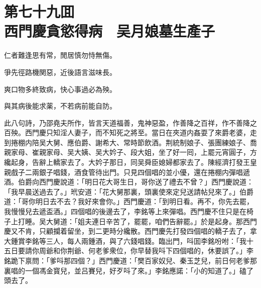 
\chapter*{第七十九囬　\\西門慶貪慾得病　吴月娘墓生產子}


\begin{myquote}
仁者難逢思有常，閒居慎勿恃無傷。

爭先徑路機関惡，近後語言滋味長。

爽口物多終致病，快心事過必為殃。

與其病後能求薬，不若病前能自防。
\end{myquote}

此八句詩，乃邵堯夫所作，皆言天道福善，鬼神惡盈，作善降之百祥，作不善降之百殃。西門慶只知淫人妻子，而不知死之將至。當日在夾道内姦耍了來爵老婆，走到捲棚内陪吴大舅、應伯爵、謝希大、常時節飲酒。荆統制娘子、張團練娘子、喬親家母、崔親家母、吴大姨、吴大妗子、段大姐，坐了好一囘，上罷元宵圓子，方纔起身，告辭上轎家去了。大妗子那日，同吴舜臣媳婦都家去了。陳經濟打發王皇親戲子二兩銀子唱錢，酒食管待出門。只見四個唱的並小優，還在捲棚内彈唱遞酒。伯爵向西門慶說道：「明日花大哥生日，哥你送了禮去不曾？」西門慶說道：「我早晨送過去了。」玳安道：「花大舅那裏，頭裏使來定兒送請帖兒來了。」伯爵道：「哥你明日去不去？我好來會你。」西門慶道：「到明日看。再不，你先去罷，我慢慢兒去遞盃酒。」四個唱的後邊去了，李銘等上來彈唱。西門慶不住只是在椅子上打睡。吴大舅道：「姐夫連日辛苦了，罷罷，咱們告辭罷。」於是起身。那西門慶又不肯，只顧攔着留坐，到二更時分纔散。西門慶先打發四個唱的轎子去了，拿大鍾賞李銘等三人，每人兩鍾酒，與了六錢唱錢。臨出門，呌囬李銘吩咐：「我十五日要請你周爺和你荆爺、何老爹衆位，你早替我呌下四個唱的，休要誤了。」李銘跪下禀問：「爹呌那四個？」西門慶道：「樊百家奴兒、秦玉芝兒，前日何老爹那裏唱的一個馮金寳兒，並吕賽兒，好歹呌了來。」李銘應諾：「小的知道了。」磕了頭去了。

